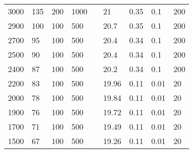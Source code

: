 \begin{longtable}[c]{|l|l|l|l|l|l|l|l|l|}
    3000          & 135                       & 200                       & 1000                       &  & 21         & 0.35                       & 0.1                        & 200                        \\ \cline{1-4} \cline{6-9}
    2900          & 100                       & 100                       & 500                        &  & 20.7       & 0.35                       & 0.1                        & 200                        \\ \cline{1-4} \cline{6-9}
    2700          & 95                        & 100                       & 500                        &  & 20.4       & 0.34                      & 0.1                        & 200                        \\ \cline{1-4} \cline{6-9}
    2500          & 90                        & 100                       & 500                        &  & 20.4       & 0.34                       & 0.1                        & 200                        \\ \cline{1-4} \cline{6-9}
    2400          & 87                        & 100                       & 500                        &  & 20.2       & 0.34                       & 0.1                        & 200                        \\ \cline{1-4} \cline{6-9}
    2200          & 83                        & 100                       & 500                        &  & 19.96      & 0.11                       & 0.01                       & 20                         \\ \cline{1-4} \cline{6-9}
    2000          & 78                        & 100                       & 500                        &  & 19.84      & 0.11                      & 0.01                       & 20                         \\ \cline{1-4} \cline{6-9}
    1900          & 76                        & 100                       & 500                        &  & 19.72      & 0.11                      & 0.01                       & 20                         \\ \cline{1-4} \cline{6-9}
    1700          & 71                        & 100                       & 500                        &  & 19.49      & 0.11                      & 0.01                       & 20                         \\ \cline{1-4} \cline{6-9}
    1500          & 67                        & 100                       & 500                        &  & 19.26      & 0.11                      & 0.01                       & 20                         \\ \cline{1-4} \cline{6-9}

\end{longtable}
